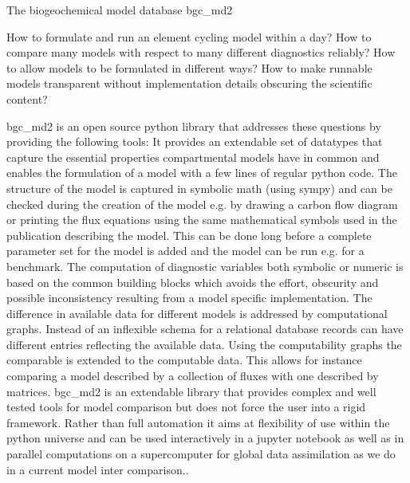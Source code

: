 The biogeochemical model database bgc_md2

How to formulate and run an element cycling model within a day?
How to compare many models with respect to many different diagnostics reliably? 
How to allow models to be formulated in different ways?
How to make runnable models transparent without implementation details obscuring the scientific content?

bgc_md2 is an open source python library that addresses these questions by providing the following tools:
It provides an extendable set of datatypes that capture the essential properties compartmental models have in common and enables the formulation of a model with a few lines of regular python code. The structure of the model is captured in symbolic math (using sympy) and can be checked during the creation of the model e.g. by drawing a carbon flow diagram or printing the flux equations using the same mathematical symbols used in the publication describing the model. 
This can be done long before a complete parameter set for the model is added and the model can be run e.g. for a benchmark.
The computation of diagnostic variables both symbolic or numeric is based on the common building blocks which avoids the effort, obscurity and possible inconsistency resulting from a model specific implementation. The difference in available data for different models is addressed by computational graphs.
Instead of an inflexible schema for a relational database records can have different entries reflecting the available data.
Using the computability graphs the comparable is extended to the computable data. This allows for instance comparing a model described by a collection of fluxes with one described by matrices.
bgc_md2 is an extendable library that provides complex and well tested tools for model comparison but does not force the user into a rigid framework.
Rather than full automation it aims at flexibility of use within the python universe and can be used interactively in a jupyter notebook as well as in parallel computations on a supercomputer for global data assimilation as we do in a current model inter comparison..

